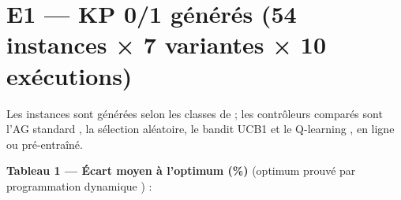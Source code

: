 \documentclass[
  french,
  11pt,
  a4paper,
]{article}
\begin{document}
\section{E1 --- KP 0/1 générés (54 instances × 7 variantes × 10
exécutions)}\label{analyse_resultats-e1-kp-01-guxe9nuxe9ruxe9s-54-instances-7-variantes-10-exuxe9cutions}

Les instances sont générées selon les classes de
\textcite{pisinger_where_2005} ; les contrôleurs comparés sont l'AG
standard \autocite{holland_1975,goldberg_1989}, la sélection aléatoire,
le bandit UCB1 \autocite{auer_2002} et le Q-learning
\autocite{watkins_dayan_1992,sutton_barto_2018}, en ligne ou
pré-entraîné.

\textbf{Tableau 1 --- Écart moyen à l'optimum (\%)} (optimum prouvé par
programmation dynamique
\autocite{bellman_1957,kellerer_knapsack_book_2004}) :
\end{document}
